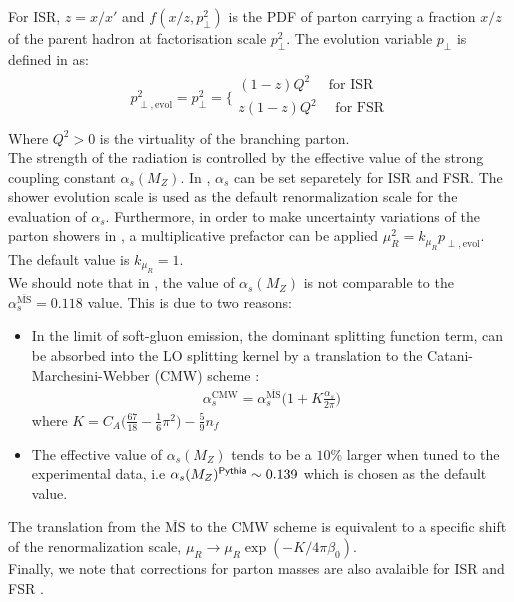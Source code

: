 For ISR, $z=x/x'$ and $f(x/z,p_\perp^2)$ is the PDF of parton carrying a fraction $x/z$
of the parent hadron at factorisation scale $p_\perp^2$. The evolution variable $p_\perp$ is defined in 
\Pythia as:
\begin{eqnarray}
 p_{\perp,\text{evol}}^2 = p_\perp^2 = \bigg\{ \begin{array}{c}
                            (1-z) Q^2 \quad \text{ for ISR} \\
                            z (1-z) Q^2 \quad \text{ for FSR} \\
                           \end{array}
\end{eqnarray}
Where $Q^2 > 0$ is the virtuality of the branching parton. \\
The strength of the radiation is controlled by the effective value of the 
strong coupling constant $\alpha_s(M_Z)$. In \Pythia, $\alpha_s$ can be 
set separetely for ISR and FSR. The shower evolution scale is used as the 
default renormalization scale for the evaluation of $\alpha_s$. Furthermore,
in order to make uncertainty variations of the parton showers in \Pythia, a 
multiplicative prefactor can be applied $\mu_R^2 = k_{\mu_R} p_{\perp, \text{evol}}$. The default 
value is $k_{\mu_R} = 1$. \\
We should note that in \Pythia, the value of $\alpha_s(M_Z)$ is not comparable
to the $\alpha_s^{\overline{\text{MS}}}=0.118$ value. This is due to two reasons:
\begin{itemize}
 \item In the limit of soft-gluon emission, the dominant splitting function term,
 can be absorbed into the LO splitting kernel by a translation to the Catani-Marchesini-Webber (CMW) scheme \cite{Catani:1990rr}:
 \begin{eqnarray}
  \alpha_s^{\text{CMW}} = \alpha_s^{\overline{\text{MS}}} \bigg(1 + K \frac{\alpha_s}{2 \pi} \bigg)
 \end{eqnarray}
where $K = C_A \bigg(\frac{67}{18} - \frac{1}{6} \pi^2 \bigg) - \frac{5}{9} n_f$
\item The effective value of $\alpha_s(M_Z)$ tends to be a $10\%$ larger when tuned to the experimental
data, i.e $\alpha_s(M_Z)^{\textsf{Pythia}} \sim 0.139$ which is chosen as the default value.
\end{itemize}
The translation from the $\overline{\text{MS}}$ to the CMW scheme is equivalent
to a specific shift of the renormalization scale, $\mu_R \to \mu_R \exp(-K/4\pi\beta_0)$. \\
Finally, we note that corrections for parton masses are also avalaible for ISR \cite{Sjostrand:2004ef} 
and FSR \cite{Norrbin:2000uu}.

